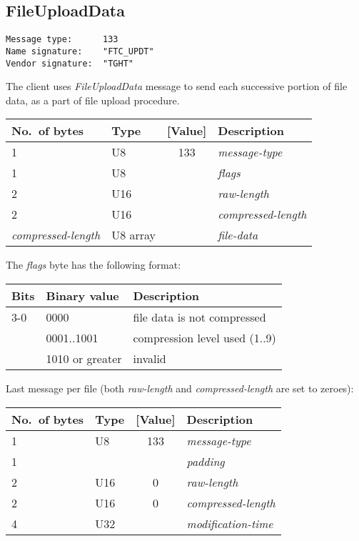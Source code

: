 \documentclass[a4paper]{article}
\newcommand{\typestr}[1]{\textit{#1}}
\begin{document}
\newpage
\subsection{FileUploadData}
\begin{verbatim}
Message type:      133
Name signature:    "FTC_UPDT"
Vendor signature:  "TGHT"
\end{verbatim}

The client uses \typestr{FileUploadData} message to send each
successive portion of file data, as a part of file upload procedure.

\begin{tabular}{l|lc|l} \hline
No.\ of bytes & Type & [Value] & Description \\ \hline
1 & U8  & 133 & \typestr{message-type} \\
1 & U8  &     & \typestr{flags} \\
2 & U16 &     & \typestr{raw-length} \\
2 & U16 &     & \typestr{compressed-length} \\
\typestr{compressed-length} & U8 array & & \typestr{file-data} \\
\hline\end{tabular}

The \typestr{flags} byte has the following format:

\begin{tabular}{l|l|l}
\hline
Bits & Binary value   & Description \\ \hline
3-0 & 0000            & file data is not compressed \\
    & 0001..1001      & compression level used (1..9) \\
    & 1010 or greater & invalid \\
\hline
\end{tabular}

Last message per file (both \typestr{raw-length} and
\typestr{compressed-length} are set to zeroes):

\begin{tabular}{l|lc|l} \hline
No.\ of bytes & Type & [Value] & Description \\ \hline
1 & U8  & 133 & \typestr{message-type} \\
1 &     &     & \typestr{padding} \\
2 & U16 &   0 & \typestr{raw-length} \\
2 & U16 &   0 & \typestr{compressed-length} \\
4 & U32 &     & \typestr{modification-time} \\
\hline\end{tabular}
\end{document}
